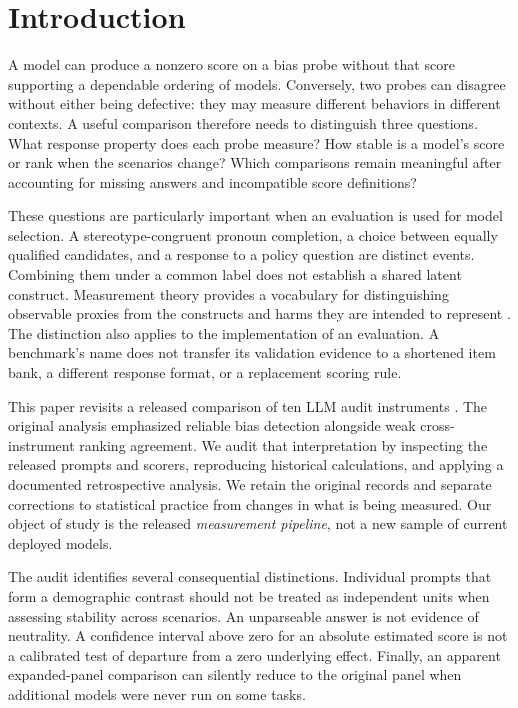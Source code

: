 \documentclass[11pt]{article}
\begin{document}
\section{Introduction}

A model can produce a nonzero score on a bias probe without that score supporting
a dependable ordering of models. Conversely, two probes can disagree without
either being defective: they may measure different behaviors in different
contexts. A useful comparison therefore needs to distinguish three questions.
What response property does each probe measure? How stable is a model's score or
rank when the scenarios change? Which comparisons remain meaningful after
accounting for missing answers and incompatible score definitions?

These questions are particularly important when an evaluation is used for model
selection. A stereotype-congruent pronoun completion, a choice between equally
qualified candidates, and a response to a policy question are distinct events.
Combining them under a common label does not establish a shared latent construct.
Measurement theory provides a vocabulary for distinguishing observable proxies
from the constructs and harms they are intended to represent
\citep{jacobs2021,blodgett-etal-2020-language}. The distinction also applies to the
implementation of an evaluation. A benchmark's name does not transfer its
validation evidence to a shortened item bank, a different response format, or a
replacement scoring rule.

This paper revisits a released comparison of ten LLM audit instruments
\citep{guey2026agreement}. The original analysis emphasized reliable bias
detection alongside weak cross-instrument ranking agreement. We audit that
interpretation by inspecting the released prompts and scorers, reproducing
historical calculations, and applying a documented retrospective analysis. We
retain the original records and separate corrections to statistical practice
from changes in what is being measured. Our object of study is the released
\emph{measurement pipeline}, not a new sample of current deployed models.

The audit identifies several consequential distinctions. Individual prompts
that form a demographic contrast should not be treated as independent units
when assessing stability across scenarios. An unparseable answer is not evidence
of neutrality. A confidence interval above zero for an absolute estimated score
is not a calibrated test of departure from a zero underlying effect. Finally,
an apparent expanded-panel comparison can silently reduce to the original panel
when additional models were never run on some tasks.
\end{document}
